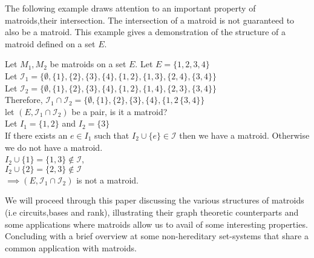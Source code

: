 \documentclass[../main.tex]{subfiles}
\begin{document}
The following example draws attention to an important property of matroids,their intersection. The intersection of a matroid is not guaranteed to also be a matroid. This example gives a demonstration of the structure of a matroid defined on a set $E.$
\begin{exmp}Let $M_1, M_2$ be matroids on a set $E.$ Let $E=\{1,2,3,4\}$\\
\noindent Let $\mathcal{I}_1 = \{\emptyset, \{1\},\{2\},\{3\},\{4\},\{1,2\},\{1,3\},\{2,4\},\{3,4\}\}$\\
\noindent Let $\mathcal{I}_2 = \{\emptyset, \{1\},\{2\},\{3\},\{4\},\{1,2\},\{1,4\},\{2,3\},\{3,4\}\}$\\
\noindent Therefore, $\mathcal{I}_1 \cap \mathcal{I}_2 = \{\emptyset, \{1\},\{2\},\{3\},\{4\},\{1,2\,\{3,4\}\}$\\
let $(E, \mathcal{I}_1 \cap \mathcal{I}_2)$ be a pair, is it a matroid?\\
Let $I_1 = \{1,2\}$ and $I_2=\{3\}$\\
If there exists an $e \in I_1$ such that $I_2 \cup \{e\} \in \mathcal{I}$ then we have a matroid. Otherwise we do not have a matroid.\\
$I_2 \cup \{1\} = \{1,3\} \notin \mathcal{I}$,\\
$I_2 \cup \{2\} = \{2,3\} \notin \mathcal{I}$\\
\noindent $\implies (E, \mathcal{I}_1 \cap \mathcal{I}_2)$ is not a matroid.
\end{exmp}
\noindent We will proceed through this paper discussing the various structures of matroids (i.e circuits,bases and rank), illustrating their graph theoretic counterparts and some applications where matroids allow us to avail of some interesting properties. Concluding with a brief overview at some non-hereditary set-systems that share a common application with matroids.
\end{document}
